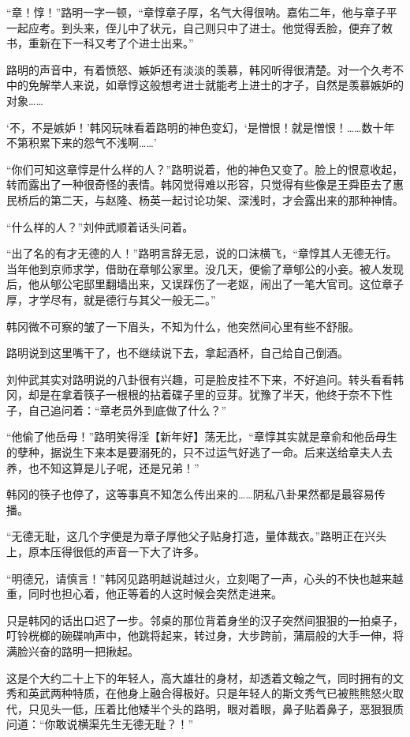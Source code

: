 “章！惇！”路明一字一顿，“章惇章子厚，名气大得很呐。嘉佑二年，他与章子平一起应考。到头来，侄儿中了状元，自己则只中了进士。他觉得丢脸，便弃了敇书，重新在下一科又考了个进士出来。”

路明的声音中，有着愤怒、嫉妒还有淡淡的羡慕，韩冈听得很清楚。对一个久考不中的免解举人来说，如章惇这般想考进士就能考上进士的才子，自然是羡慕嫉妒的对象……

‘不，不是嫉妒！’韩冈玩味看着路明的神色变幻，‘是憎恨！就是憎恨！……数十年不第积累下来的怨气不浅啊……’

“你们可知这章惇是什么样的人？”路明说着，他的神色又变了。脸上的恨意收起，转而露出了一种很奇怪的表情。韩冈觉得难以形容，只觉得有些像是王舜臣去了惠民桥后的第二天，与赵隆、杨英一起讨论功架、深浅时，才会露出来的那种神情。

“什么样的人？”刘仲武顺着话头问着。

“出了名的有才无德的人！”路明言辞无忌，说的口沫横飞，“章惇其人无德无行。当年他到京师求学，借助在章郇公家里。没几天，便偷了章郇公的小妾。被人发现后，他从郇公宅邸里翻墙出来，又误踩伤了一老妪，闹出了一笔大官司。这位章子厚，才学尽有，就是德行与其父一般无二。”

韩冈微不可察的皱了一下眉头，不知为什么，他突然间心里有些不舒服。

路明说到这里嘴干了，也不继续说下去，拿起酒杯，自己给自己倒酒。

刘仲武其实对路明说的八卦很有兴趣，可是脸皮挂不下来，不好追问。转头看看韩冈，却是在拿着筷子一根根的拈着碟子里的豆芽。犹豫了半天，他终于奈不下性子，自己追问着：“章老员外到底做了什么？”

“他偷了他岳母！”路明笑得淫【新年好】荡无比，“章惇其实就是章俞和他岳母生的孽种，据说生下来本是要溺死的，只不过运气好逃了一命。后来送给章夫人去养，也不知这算是儿子呢，还是兄弟！”

韩冈的筷子也停了，这等事真不知怎么传出来的……阴私八卦果然都是最容易传播。

“无德无耻，这几个字便是为章子厚他父子贴身打造，量体裁衣。”路明正在兴头上，原本压得很低的声音一下大了许多。

“明德兄，请慎言！”韩冈见路明越说越过火，立刻喝了一声，心头的不快也越来越重，同时也担心着，他正等着的人这时候会突然走进来。

只是韩冈的话出口迟了一步。邻桌的那位背着身坐的汉子突然间狠狠的一拍桌子，叮铃桄榔的碗碟响声中，他跳将起来，转过身，大步跨前，蒲扇般的大手一伸，将满脸兴奋的路明一把揪起。

这是个大约二十上下的年轻人，高大雄壮的身材，却透着文翰之气，同时拥有的文秀和英武两种特质，在他身上融合得极好。只是年轻人的斯文秀气已被熊熊怒火取代，只见头一低，压着比他矮半个头的路明，眼对着眼，鼻子贴着鼻子，恶狠狠质问道：“你敢说横渠先生无德无耻？！”

